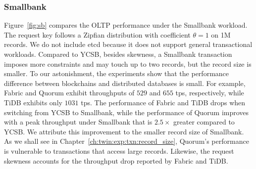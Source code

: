 \subsubsection{Smallbank}

Figure~\ref{fig:sb} compares the OLTP performance under the Smallbank workload.
The request key follows a Zipfian distribution with coefficient $\theta=1$ on 1M
records.
We do not include etcd because it does not support general transactional
workloads.
Compared to YCSB, besides skewness, a Smallbank transaction imposes more
constraints and may touch up to two records, but the record size is smaller.
To our astonishment, the experiments show that the performance difference
between blockchains and distributed databases is small. For example, Fabric and
Quorum exhibit throughputs of $529$ and $655$ tps, respectively, while TiDB
exhibits only $1031$ tps.
The performance of Fabric and TiDB drops when switching from YCSB to Smallbank,
while the performance of Quorum improves with a peak throughput under Smallbank
that is $2.5\times$ greater compared to YCSB.
We attribute this improvement to the smaller record size of Smallbank.
As we shall see in Chapter~\ref{ch:twin:exp:txn:record_size}, Quorum's performance
is vulnerable to transactions that access large records.
Likewise, the request skewness accounts for the throughput drop reported by Fabric and TiDB. 

